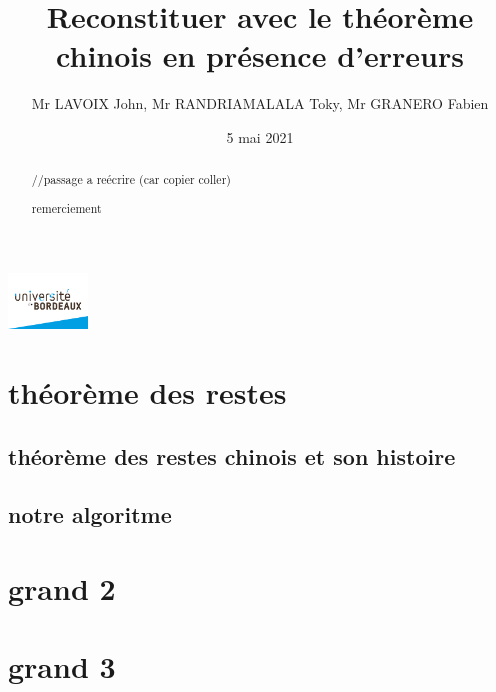 \documentclass[a4paper, 11pt]{article}
\title{Reconstituer avec le théorème chinois en présence d’erreurs}
\author{Mr LAVOIX John, Mr RANDRIAMALALA Toky, Mr GRANERO Fabien }
\date{5 mai 2021}
\begin{document}
\begin{abstract}

//passage a reécrire (car copier coller) 
\end{abstract}
\includegraphics[height=1.5cm]{bordeau.png}

\newpage

\tableofcontents

\newpage
\begin{abstract}
    remerciement
\end{abstract}

\newpage
\section{théorème des restes}
\subsection{théorème des restes chinois et son histoire}
\subsection{notre algoritme}

\newpage
\section{grand 2}

\newpage
\section{grand 3}
\end{document}
